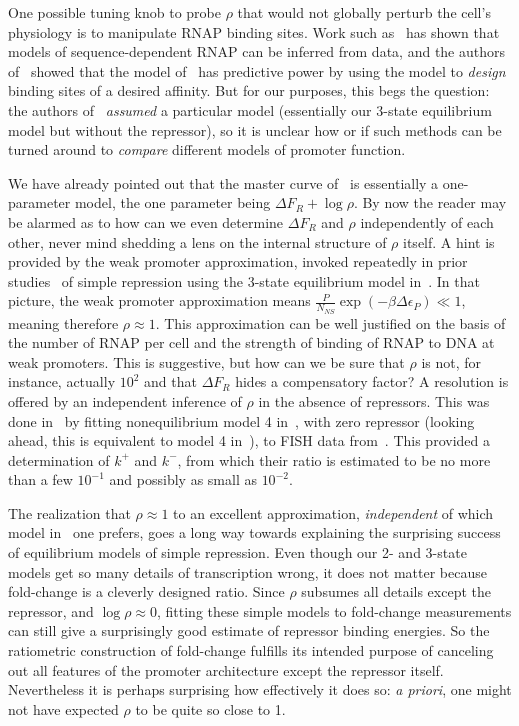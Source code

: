 One possible tuning knob to probe $\rho$ that would not globally perturb the
cell's physiology is to manipulate RNAP binding sites. Work such
as~\cite{Kinney2010} has shown that models of sequence-dependent RNAP can be
inferred from data, and the authors of~\cite{Brewster2012} showed that the model
of~\cite{Kinney2010} has predictive power by using the model to \textit{design}
binding sites of a desired affinity. But for our purposes, this begs the
question: the authors of~\cite{Kinney2010} \textit{assumed} a particular model
(essentially our 3-state equilibrium model but without the repressor), so it is
unclear how or if such methods can be turned around to \textit{compare}
different models of promoter function.

We have already pointed out that the master curve of~
is essentially a one-parameter model, the one parameter being $\Delta F_R +
\log\rho$. By now the reader may be alarmed as to how can we even determine
$\Delta F_R$ and $\rho$ independently of each other, never mind shedding a lens
on the internal structure of $\rho$ itself. A hint is provided by the weak
promoter approximation, invoked repeatedly in prior studies~\cite{Bintu2005c,
Garcia2011a, Razo-Mejia2018} of simple repression using the 3-state equilibrium
model in~. In that picture, the weak promoter
approximation means $\frac{P}{N_{NS}}\exp(-\beta\Delta\epsilon_P) \ll 1$,
meaning therefore $\rho\approx1$.  This approximation can be well
justified on the basis of the number of RNAP per cell and the strength of
binding of RNAP to DNA at weak promoters.  This is suggestive, but how can we be sure
that $\rho$ is not, for instance, actually $10^2$ and that $\Delta F_R$ hides a
compensatory factor? A resolution is offered by an independent inference of
$\rho$ in the absence of repressors. This was done in~\cite{Razo-Mejia2020} by
fitting nonequilibrium model 4  in~, with zero
repressor (looking ahead, this is equivalent to model 4
in~), to FISH data from~\cite{Brewster2014}. This
provided a determination of $k^+$ and $k^-$, from which their ratio is estimated
to be no more than a few $10^{-1}$ and possibly as small as $10^{-2}$.

The realization that $\rho\approx1$ to an excellent approximation,
\textit{independent} of which model in~ one prefers,
goes a long way towards explaining the surprising success of equilibrium models
of simple repression. Even though our 2- and 3-state models get so many details
of transcription wrong, it does not matter because fold-change is a cleverly
designed ratio. Since $\rho$ subsumes all details except the repressor, and
$\log\rho\approx0$, fitting these simple models to fold-change measurements can
still give a surprisingly good estimate of repressor binding energies. So the
ratiometric construction of fold-change fulfills its intended purpose of
canceling out all features of the promoter architecture except the repressor
itself. Nevertheless it is perhaps surprising how effectively it does so:
\textit{a priori}, one might not have expected $\rho$ to be quite so close to 1.

